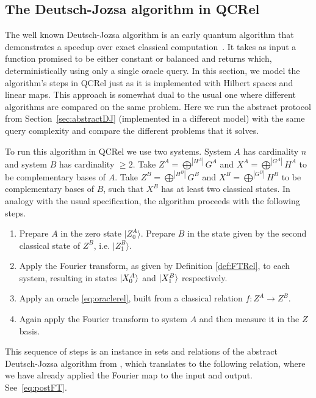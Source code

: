 \subsection{The Deutsch-Jozsa algorithm in QCRel}
\label{sec:qcreldj}
The well known Deutsch-Jozsa algorithm is an early quantum algorithm that demonstrates a speedup over exact classical computation~\cite{deutsch1992rapid}. It takes as input a function promised to be either constant or balanced and returns which, deterministically using only a single oracle query. In this section, we model the algorithm's steps in QCRel just as it is implemented with Hilbert spaces and linear maps. This approach is somewhat dual to the usual one where different algorithms are compared on the same problem. Here we run the abstract protocol from Section~\ref{sec:abstractDJ} (implemented in a different model) with the same query complexity and compare the different problems that it solves.

To run this algorithm in QCRel we use two systems.  System $A$ has cardinality $n$ and system $B$ has cardinality $\ge 2$. Take $Z^A=\bigoplus^{|H^{A}|}G^A$ and $X^A=\bigoplus^{|G^{A}|}H^A$ to be complementary bases of $A$. Take $Z^B=\bigoplus^{|H^{B}|}G^B$ and $X^B=\bigoplus^{|G^{B}|}H^B$ to be complementary bases of $B$, such that $X^B$ has at least two classical states. In analogy with the usual specification, the algorithm proceeds with the following steps.
\begin{enumerate}
\item Prepare $A$ in the zero state $|Z^{A}_0\rangle$. Prepare $B$ in the state given by the second classical state of $Z^B$, i.e. $|Z^B_1\rangle$.

\item Apply the Fourier transform, as given by Definition \ref{def:FTRel}, to each system, resulting in states $| X_0^A \rangle$ and $| X_1^B \rangle$ respectively.

\item Apply an oracle \eqref{eq:oraclerel}, built from a classical relation $f:Z^A\to Z^B$.

\item Again apply the Fourier transform to system $A$ and then measure it in the $Z$ basis.
\end{enumerate}

\noindent This sequence of steps is an instance in sets and relations of the abstract Deutsch-Jozsa algorithm from \cite{vicary-tqa}, which translates to the following relation, where we have already applied the Fourier map  to the input and output. See~\eqref{eq:postFT}.

